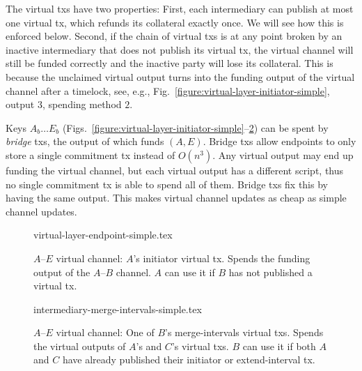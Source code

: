   The virtual txs have two properties: First, each intermediary can
  publish at most one virtual tx, which refunds its collateral
  exactly once. We will see how this is enforced below. Second, if the chain of
  virtual txs is at any point broken by
  an inactive intermediary that does not publish its virtual tx, the
  virtual channel will still be funded correctly and the inactive party will
  lose its collateral. This is because
  the unclaimed virtual output turns into the funding output of
  the virtual channel
  after a timelock, see, e.g., Fig.~\ref{figure:virtual-layer-initiator-simple},
  output $3$, spending method $2$.

  Keys $A_b \dots E_b$
  (Figs.~\ref{figure:virtual-layer-initiator-simple}--\ref{figure:virtual-layer-merge-intervals-simple}) can be
  spent by \emph{bridge} txs, the output of which funds $(A, E)$.
  Bridge txs allow endpoints to only store a single commitment tx instead of $O(n^3)$.
  Any virtual output may end up funding the virtual channel, but each
  virtual output has a different script, thus no single
  commitment tx is able to spend all of them. Bridge txs fix this by having the
  same output. This makes virtual channel updates as cheap as simple channel
  updates.

%
  \begin{figure}[!htbp]
%
    {virtual-layer-endpoint-simple.tex}
    \caption{$A$--$E$ virtual channel: $A$'s initiator virtual tx. Spends the
    funding output of the $A$--$B$ channel. $A$ can use it if $B$ has not published
    a virtual tx.}
    \label{figure:virtual-layer-endpoint-simple}
  \end{figure}
%
%
  \begin{figure}
%
    {intermediary-merge-intervals-simple.tex}
    \caption{$A$--$E$ virtual channel: One of $B$'s merge-intervals
    virtual txs. Spends the virtual outputs of $A$'s and $C$'s virtual
    txs. $B$ can use it if both $A$ and $C$ have already published
    their initiator or extend-interval tx.}
    \label{figure:virtual-layer-merge-intervals-simple}
  \end{figure}
%

